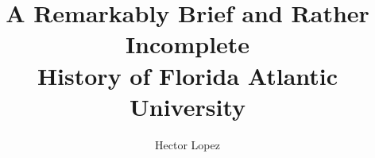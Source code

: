 \documentclass[phd, 12pt, print]{fauthesis}
\title{A Remarkably Brief and Rather Incomplete\\ History of Florida Atlantic University}
\author{Hector Lopez}
\begin{document}
\frontmatter

\maketitle
\makecopyright
\makesignature



%
 
%
% 
% 


\appendix %



%
%



\end{document}
